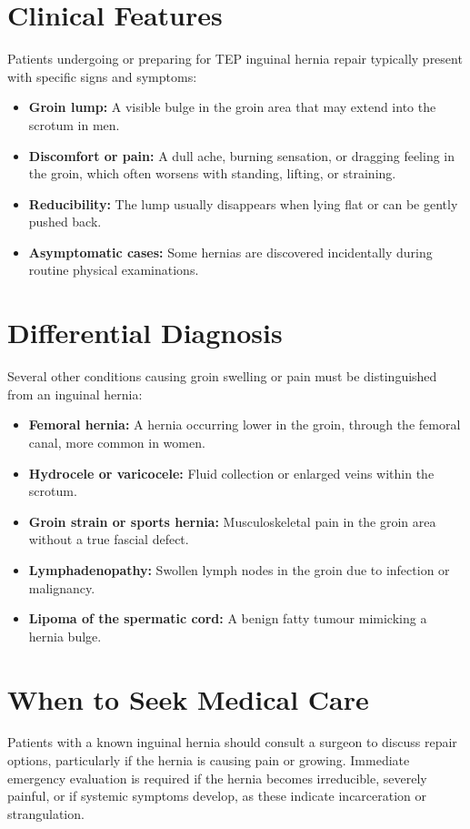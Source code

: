 \section*{Clinical Features}
Patients undergoing or preparing for TEP inguinal hernia repair typically present with specific signs and symptoms:

\begin{itemize}
    \item \textbf{Groin lump:} A visible bulge in the groin area that may extend into the scrotum in men.
    \item \textbf{Discomfort or pain:} A dull ache, burning sensation, or dragging feeling in the groin, which often worsens with standing, lifting, or straining.
    \item \textbf{Reducibility:} The lump usually disappears when lying flat or can be gently pushed back.
    \item \textbf{Asymptomatic cases:} Some hernias are discovered incidentally during routine physical examinations.
\end{itemize}

\section*{Differential Diagnosis}
Several other conditions causing groin swelling or pain must be distinguished from an inguinal hernia:

\begin{itemize}
    \item \textbf{Femoral hernia:} A hernia occurring lower in the groin, through the femoral canal, more common in women.
    \item \textbf{Hydrocele or varicocele:} Fluid collection or enlarged veins within the scrotum.
    \item \textbf{Groin strain or sports hernia:} Musculoskeletal pain in the groin area without a true fascial defect.
    \item \textbf{Lymphadenopathy:} Swollen lymph nodes in the groin due to infection or malignancy.
    \item \textbf{Lipoma of the spermatic cord:} A benign fatty tumour mimicking a hernia bulge.
\end{itemize}

\section*{When to Seek Medical Care}
Patients with a known inguinal hernia should consult a surgeon to discuss repair options, particularly if the hernia is causing pain or growing. Immediate emergency evaluation is required if the hernia becomes irreducible, severely painful, or if systemic symptoms develop, as these indicate incarceration or strangulation.

